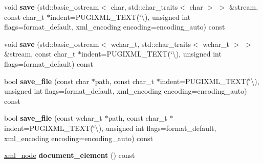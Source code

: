 \begin{DoxyCompactItemize}
void {\bfseries save} (std\+::basic\+\_\+ostream$<$ char, std\+::char\+\_\+traits$<$ char $>$ $>$ \&stream, const char\+\_\+t $\ast$indent=P\+U\+G\+I\+X\+M\+L\+\_\+\+T\+E\+XT(\char`\"{}\textbackslash{}), unsigned int flags=format\+\_\+default, xml\+\_\+encoding encoding=encoding\+\_\+auto) const
\item 
\mbox{\label{classpugi_1_1xml__document_a0fb8706fb61aec51c3ee007f83d55042}} 
void {\bfseries save} (std\+::basic\+\_\+ostream$<$ wchar\+\_\+t, std\+::char\+\_\+traits$<$ wchar\+\_\+t $>$ $>$ \&stream, const char\+\_\+t $\ast$indent=P\+U\+G\+I\+X\+M\+L\+\_\+\+T\+E\+XT(\char`\"{}\textbackslash{}), unsigned int flags=format\+\_\+default) const
\item 
\mbox{\label{classpugi_1_1xml__document_a314173ef14ee2fbf1b5e05db0f40f1b0}} 
bool {\bfseries save\+\_\+file} (const char $\ast$path, const char\+\_\+t $\ast$indent=P\+U\+G\+I\+X\+M\+L\+\_\+\+T\+E\+XT(\char`\"{}\textbackslash{}), unsigned int flags=format\+\_\+default, xml\+\_\+encoding encoding=encoding\+\_\+auto) const
\item 
\mbox{\label{classpugi_1_1xml__document_ad8888bece50ac49111eb4a87a15eeb22}} 
bool {\bfseries save\+\_\+file} (const wchar\+\_\+t $\ast$path, const char\+\_\+t $\ast$indent=P\+U\+G\+I\+X\+M\+L\+\_\+\+T\+E\+XT(\char`\"{}\textbackslash{}), unsigned int flags=format\+\_\+default, xml\+\_\+encoding encoding=encoding\+\_\+auto) const
\item 
\mbox{\label{classpugi_1_1xml__document_a6da98e50116c4c434de41e0a6c83170a}} 
\hyperlink{classpugi_1_1xml__node}{xml\+\_\+node} {\bfseries document\+\_\+element} () const
\end{DoxyCompactItemize}
